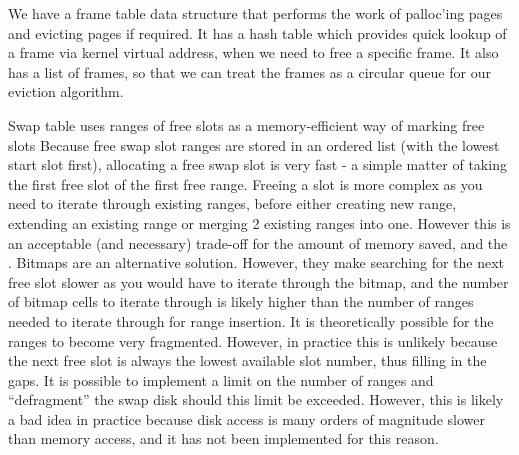 We have a frame table data structure that performs the work of palloc'ing pages
and evicting pages if required. It has a hash table which provides quick lookup
of a frame via kernel virtual address, when we need to free a specific frame. It
also has a list of frames, so that we can treat the frames as a circular queue
for our eviction algorithm.

Swap table
	uses ranges of free slots as a memory-efficient way of marking free slots
	Because free swap slot ranges are stored in an ordered list (with the lowest start slot first), allocating a free swap slot is very fast - a simple matter of taking the first free slot of the first free range.
	Freeing a slot is more complex as you need to iterate through existing ranges, before either creating new range, extending an existing range or merging 2 existing ranges into one. However this is an acceptable (and necessary) trade-off for the amount of memory saved, and the . 
	Bitmaps are an alternative solution. However, they make searching for the next free slot slower as you would have to iterate through the bitmap, and the number of bitmap cells to iterate through is likely higher than the number of ranges needed to iterate through for range insertion.
	It is theoretically possible for the ranges to become very fragmented. However, in practice this is unlikely because the next free slot is always the lowest available slot number, thus filling in the gaps. It is possible to implement a limit on the number of ranges and ``defragment'' the swap disk should this limit be exceeded. However, this is likely a bad idea in practice because disk access is many orders of magnitude slower than memory access, and it has not been implemented for this reason.

